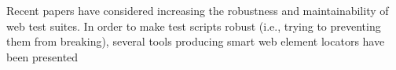 Recent papers have considered increasing the robustness and maintainability of web test suites. 
In order to make test scripts robust (i.e., trying to preventing them from breaking), several tools producing smart web element locators have been presented~\cite{2016-Leotta-JSEP,kartik:ase15,2015-leotta-ICST,Yandrapally:2014:RTA:2610384.2610390}

%

